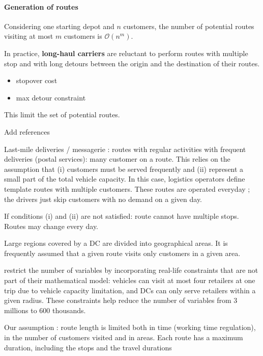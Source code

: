 \documentclass[a4paper,10pt]{article}
\begin{document}
\begin{linenumbers}
\paragraph{Generation of routes}


Considering one starting depot and $n$ customers, the number of potential routes visiting at most $m$ customers 
is $\mathcal{O}(n^m)$.

In practice, \textbf{long-haul carriers} are reluctant to perform routes with multiple stop and with long detours between the origin and the destination of their routes. 

\begin{itemize}
	\item stopover cost
	\item max detour constraint
\end{itemize}
This limit the set of potential routes. 

Add references 

Last-mile deliveries / messagerie : routes with regular activities with frequent deliveries (postal services): many customer on a route. This relies on the assumption that (i) customers must be served frequently and (ii) represent a small part of the total vehicle capacity. In this case, logistics operators define template routes with multiple customers. These routes are operated everyday ; the drivers just skip customers with no demand on a given day. 

If conditions (i) and (ii) are not satisfied: route cannot have multiple stops. Routes may change every day. 

Large regions covered by a DC are divided into geographical areas. It is frequently assumed that a given route visits only customers in a given area.


\cite{Zheng2019} restrict the number of variables by incorporating real-life constraints that are not part of their mathematical model: vehicles can visit at most four retailers at one trip due to vehicle capacity limitation, and DCs can only serve retailers within a given radius. These constraints help reduce the number of variables from 3 millions to 600 thousands.

Our assumption : route length is limited both in time (working time regulation), in the number of customers visited and in areas.   Each route has a maximum duration, including the stops and the travel durations




\end{linenumbers}
\end{document}
